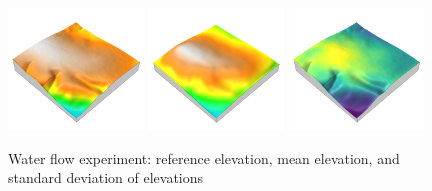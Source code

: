 \documentclass[prodmode,acmtochi]{acmsmall} %
\begin{document}
\begin{figure}[h!]
\begin{center}
		\includegraphics[width=0.32\textwidth]{images/render_3d/dem_4.png}
		\includegraphics[width=0.32\textwidth]{images/render_3d/mean_dem_4.png}
		\includegraphics[width=0.32\textwidth]{images/render_3d/stdev_dem_4.png}
	\caption{Water flow experiment: reference elevation, mean elevation, and standard deviation of elevations}
	\label{fig:}
\end{center}
\end{figure}
\end{document}
